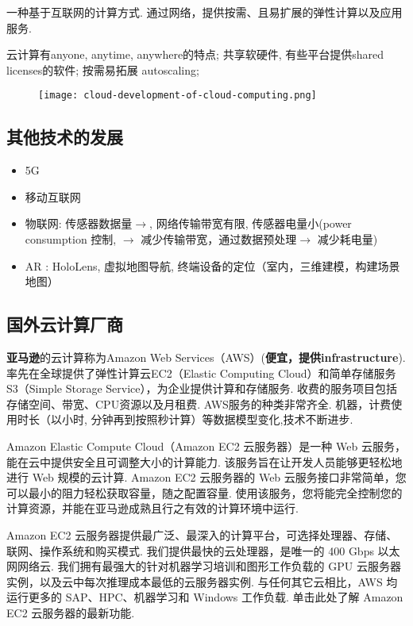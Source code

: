 \begin{definition}[云计算]
    一种基于互联网的计算方式. 通过网络，提供按需、且易扩展的弹性计算以及应用服务. 
\end{definition}

云计算有anyone, anytime, anywhere的特点; 共享软硬件, 有些平台提供shared licenses的软件; 按需易拓展 autoscaling; 

\begin{figure}[htbp]
    \centering
    \texttt{[image: cloud-development-of-cloud-computing.png]}
\end{figure}

\subsection{其他技术的发展}

\begin{itemize}
    \item 5G
    \item 移动互联网
    \item 物联网: 传感器数据量$\rightarrow$, 网络传输带宽有限, 传感器电量小(power consumption 控制,  $\rightarrow$ 减少传输带宽，通过数据预处理$\rightarrow$ 减少耗电量)
    \item AR : HoloLens, 虚拟地图导航, 终端设备的定位（室内，三维建模，构建场景地图）
\end{itemize}

\subsection{国外云计算厂商}

\textbf{亚马逊}的云计算称为Amazon Web Services（AWS）(\textbf{便宜，提供infrastructure}).率先在全球提供了弹性计算云EC2（Elastic Computing Cloud）和简单存储服务S3（Simple Storage Service），为企业提供计算和存储服务. 收费的服务项目包括存储空间、带宽、CPU资源以及月租费. AWS服务的种类非常齐全. 
机器，计费使用时长（以小时, 分钟再到按照秒计算）等数据模型变化,技术不断进步.

\begin{definition}
    Amazon Elastic Compute Cloud（Amazon EC2 云服务器）是一种 Web 云服务，能在云中提供安全且可调整大小的计算能力. 该服务旨在让开发人员能够更轻松地进行 Web 规模的云计算. Amazon EC2 云服务器的 Web 云服务接口非常简单，您可以最小的阻力轻松获取容量，随之配置容量. 使用该服务，您将能完全控制您的计算资源，并能在亚马逊成熟且行之有效的计算环境中运行. 

    Amazon EC2 云服务器提供最广泛、最深入的计算平台，可选择处理器、存储、联网、操作系统和购买模式. 我们提供最快的云处理器，是唯一的 400 Gbps 以太网网络云. 我们拥有最强大的针对机器学习培训和图形工作负载的 GPU 云服务器实例，以及云中每次推理成本最低的云服务器实例. 与任何其它云相比，AWS 均运行更多的 SAP、HPC、机器学习和 Windows 工作负载. 单击此处了解 Amazon EC2 云服务器的最新功能. 
\end{definition}

